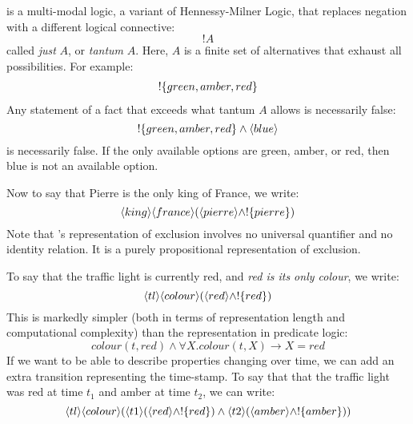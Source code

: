 \ELFULL{} is a multi-modal logic, a variant of Hennessy-Milner Logic, that replaces negation with a different logical connective:
\[
   !A
\]
called \emph{just} $A$, or \emph{tantum} $A$.
Here, $A$ is a finite set of alternatives that exhaust all
possibilities. 
For example:
\begin{eqnarray*}
! \{green, amber, red\}
\end{eqnarray*}
Any statement of a fact that exceeds what tantum $A$ allows is necessarily false:
\[
   !\{green, amber, red\} \land \langle blue \rangle \]
is necessarily false.
If the only available options are green, amber, or red, then blue is not an available option.

Now to say that Pierre is the only king of France, we write:
\[
\langle king \rangle \langle france \rangle (\langle pierre \rangle \land ! \{pierre\})
\]
Note that \ELFULL{}'s representation of exclusion involves no universal quantifier and no identity relation.
It is a purely propositional representation of exclusion.

To say that the traffic light is currently red, and \emph{red is its only colour}, we write:
\[
\langle tl \rangle \langle colour \rangle (\langle red \rangle \land !\{red\})
\]
This is markedly simpler (both in terms of representation length and computational complexity) than the representation in predicate logic:
\[
colour(t, red) \land \forall X . colour(t, X) \rightarrow X = red
\]
If we want to be able to describe properties changing over time, we can add an extra transition representing the time-stamp.
To say that that the traffic light was red at time $t_1$ and amber at time $t_2$, we can write:
\[
\langle tl \rangle \langle colour \rangle (\langle t1 \rangle (\langle red \rangle \land !\{red\}) \land \langle t2 \rangle (\langle amber \rangle \land !\{amber\}))
\]


